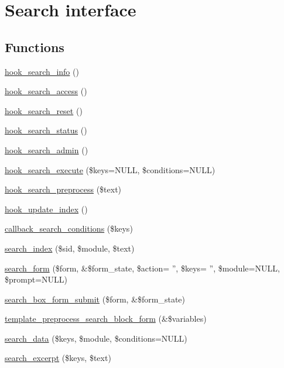 \hypertarget{group__search}{
\section{Search interface}
\label{group__search}
}
\subsection*{Functions}
\begin{DoxyCompactItemize}
\item 
\hyperlink{group__search_ga37b761616f2cad4796891008f2b374f3}{hook\_\-search\_\-info} ()
\item 
\hyperlink{group__search_gac49e6fd7370e65efeaf484ec992de1f0}{hook\_\-search\_\-access} ()
\item 
\hyperlink{group__search_gaefc7ab0e4a53a2752371dcccaec41deb}{hook\_\-search\_\-reset} ()
\item 
\hyperlink{group__search_gafb7f508058afed4fe670974b82b072f2}{hook\_\-search\_\-status} ()
\item 
\hyperlink{group__search_gae7c7a4e3d4ee63b5aab3742b0e12624e}{hook\_\-search\_\-admin} ()
\item 
\hyperlink{group__search_ga00be3e4a3b64ad73f8ad1304a450cee5}{hook\_\-search\_\-execute} (\$keys=NULL, \$conditions=NULL)
\item 
\hyperlink{group__search_ga3c935c295da9103bc7184f6ec869c533}{hook\_\-search\_\-preprocess} (\$text)
\item 
\hyperlink{group__search_ga23d6f6642bd53c4f033f10e9c1b12d43}{hook\_\-update\_\-index} ()
\item 
\hyperlink{group__search_gab59b17cb3637c3acccf3c73cd5c1195d}{callback\_\-search\_\-conditions} (\$keys)
\item 
\hyperlink{group__search_ga57ab9f6e1c404a8c248293e554373ae6}{search\_\-index} (\$sid, \$module, \$text)
\item 
\hyperlink{group__search_gae12dc9da20e7e19853dfc18f92039d98}{search\_\-form} (\$form, \&\$form\_\-state, \$action= '', \$keys= '', \$module=NULL, \$prompt=NULL)
\item 
\hyperlink{group__search_gaf91fe848f7f58fc3d63001198e485e00}{search\_\-box\_\-form\_\-submit} (\$form, \&\$form\_\-state)
\item 
\hyperlink{group__search_ga545a7c7108d985d17d8b8b4054ba66ef}{template\_\-preprocess\_\-search\_\-block\_\-form} (\&\$variables)
\item 
\hyperlink{group__search_gadc45d10981f71a4d12879254b14c2c99}{search\_\-data} (\$keys, \$module, \$conditions=NULL)
\item 
\hyperlink{group__search_gaa77622185b2d7ea771cf590d76ab3ba4}{search\_\-excerpt} (\$keys, \$text)
\end{DoxyCompactItemize}


